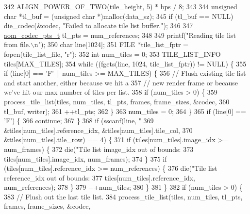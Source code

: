 \begin{DoxyCodeInclude}
{{{{{{342                          ALIGN\_POWER\_OF\_TWO(tile\_height, 5) * bps / 8;
343 
344   \textcolor{keywordtype}{unsigned} \textcolor{keywordtype}{char} *tl\_buf = (\textcolor{keywordtype}{unsigned} \textcolor{keywordtype}{char} *)malloc(data\_sz);
345   \textcolor{keywordflow}{if} (tl\_buf == NULL) die\_codec(&codec, \textcolor{stringliteral}{"Failed to allocate tile list buffer."});
346 
347   \hyperlink{group__encoder_ga958524226c9a65251c9e4f7bb78fc606}{aom\_codec\_pts\_t} tl\_pts = num\_references;
348 
349   printf(\textcolor{stringliteral}{"Reading tile list from file.\(\backslash\)n"});
350   \textcolor{keywordtype}{char} line[1024];
351   FILE *tile\_list\_fptr = fopen(tile\_list\_file, \textcolor{stringliteral}{"r"});
352   \textcolor{keywordtype}{int} num\_tiles = 0;
353   TILE\_LIST\_INFO tiles[MAX\_TILES];
354   \textcolor{keywordflow}{while} ((fgets(line, 1024, tile\_list\_fptr)) != NULL) \{
355     \textcolor{keywordflow}{if} (line[0] == \textcolor{charliteral}{'F'} || num\_tiles >= MAX\_TILES) \{
356       \textcolor{comment}{// Flush existing tile list and start another, either because we hit a}
357       \textcolor{comment}{// new render frame or because we've hit our max number of tiles per list.}
358       \textcolor{keywordflow}{if} (num\_tiles > 0) \{
359         process\_tile\_list(tiles, num\_tiles, tl\_pts, frames, frame\_sizes, &codec,
360                           tl\_buf, writer);
361         ++tl\_pts;
362       \}
363       num\_tiles = 0;
364     \}
365     \textcolor{keywordflow}{if} (line[0] == \textcolor{charliteral}{'F'}) \{
366       \textcolor{keywordflow}{continue};
367     \}
368     \textcolor{keywordflow}{if} (sscanf(line, \textcolor{stringliteral}{"%
369                &tiles[num\_tiles].reference\_idx, &tiles[num\_tiles].tile\_col,
370                &tiles[num\_tiles].tile\_row) == 4) \{
371       \textcolor{keywordflow}{if} (tiles[num\_tiles].image\_idx >= num\_frames) \{
372         die(\textcolor{stringliteral}{"Tile list image\_idx out of bounds: %
373             tiles[num\_tiles].image\_idx, num\_frames);
374       \}
375       \textcolor{keywordflow}{if} (tiles[num\_tiles].reference\_idx >= num\_references) \{
376         die(\textcolor{stringliteral}{"Tile list reference\_idx out of bounds: %
377             tiles[num\_tiles].reference\_idx, num\_references);
378       \}
379       ++num\_tiles;
380     \}
381   \}
382   \textcolor{keywordflow}{if} (num\_tiles > 0) \{
383     \textcolor{comment}{// Flush out the last tile list.}
384     process\_tile\_list(tiles, num\_tiles, tl\_pts, frames, frame\_sizes, &codec,
}}}}}}}}}
\end{DoxyCodeInclude}
